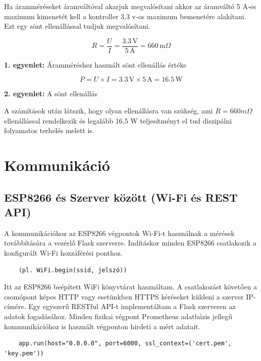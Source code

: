 Ha áramméréseket áramváltóval akarjuk megvalósítani akkor az áramváltó 5 A-es maximum kimenetét kell 
a kontroller 3,3 v-os maximum bemenetére alakítani. Ezt egy sönt ellenállással tudjuk megvalósítani.


\begin{equation}
    R = \frac{U}{I} = \frac{3.3 \, \text{V}}{5 \, \text{A}} = 660 \, \text{m}\Omega
\end{equation}
\begin{center}
    \textbf{1. egyenlet:} Áramméréshez használt sönt ellenállás értéke
\end{center}
    
\begin{equation}
    P = U \times I = 3.3 \, \text{V} \times 5 \, \text{A} = 16.5 \, \text{W}
\end{equation}
\begin{center}
    \textbf{2. egyenlet:} A sönt ellenállás
\end{center}

A számítások után látszik, hogy olyan ellenállásra van szükség, ami $R = 660 m\Omega$ ellenállással rendelkezik és legalább 16,5 W 
teljesítményt el tud diszipálni folyamatos terhelés melett is.


\section{Kommunikáció}

\subsection{ESP8266 és Szerver között (Wi-Fi és REST API)}

A kommunikációhoz az ESP8266 végpontok Wi-Fi-t használnak a mérések továbbítására a vezérlő Flask szerverre. 
Indításkor minden ESP8266 csatlakozik a konfigurált 
Wi-Fi hozzáférési ponthoz. 
\begin{lstlisting}
    (pl. WiFi.begin(ssid, jelszó))
\end{lstlisting}
Itt az ESP8266 beépített WiFi könyvtárat használtam.
\cite{techtutorialsx:esp8266flask}
A csatlakozást követően a csomópont képes HTTP vagy esetünkben HTTPS kéréseket küldeni a szerver IP-címére. 
Egy egyszerű RESTful API-t implementáltam a Flask szerveren az adatok fogadásához. 
Minden fizikai végpont Prometheus adatbázis jellegű kommunikációhoz is használt végponton hirdeti a mért adatait.
\begin{lstlisting}
    app.run(host="0.0.0.0", port=6000, ssl_context=('cert.pem', 'key.pem'))
\end{lstlisting}

